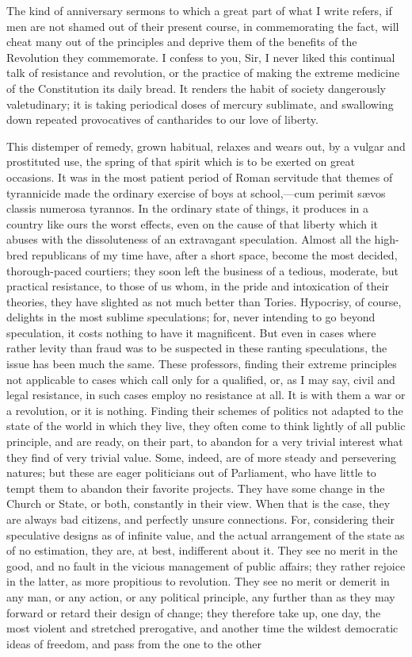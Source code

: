 The kind of anniversary sermons to which a great part of what I write refers, if men are not shamed out of their present course, in commemorating the fact, will cheat many out of the principles and deprive them of the benefits of the Revolution they commemorate. I confess to you, Sir, I never liked this continual talk of resistance and revolution, or the practice of making the extreme medicine of the Constitution its daily bread. It renders the habit of society dangerously valetudinary; it is taking periodical doses of mercury sublimate, and swallowing down repeated provocatives of cantharides to our love of liberty.

This distemper of remedy, grown habitual, relaxes and wears out, by a vulgar and prostituted use, the spring of that spirit which is to be exerted on great occasions. It was in the most patient period of Roman servitude that themes of tyrannicide made the ordinary exercise of boys at school,—cum perimit sævos classis numerosa tyrannos. In the ordinary state of things, it produces in a country like ours the worst effects, even on the cause of that liberty which it abuses with the dissoluteness of an extravagant speculation. Almost all the high-bred republicans of my time have, after a short space, become the most decided, thorough-paced courtiers; they soon left the business of a tedious, moderate, but practical resistance, to those of us whom, in the pride and intoxication of their theories, they have slighted as not much better than Tories. Hypocrisy, of course, delights in the most sublime speculations; for, never intending to go beyond speculation, it costs nothing to have it magnificent. But even in cases where rather levity than fraud was to be suspected in these ranting speculations, the issue has been much the same. These professors, finding their extreme principles not applicable to cases which call only for a qualified, or, as I may say, civil and legal resistance, in such cases employ no resistance at all. It is with them a war or a revolution, or it is nothing. Finding their schemes of politics not adapted to the state of the world in which they live, they often come to think lightly of all public principle, and are ready, on their part, to abandon for a very trivial interest what they find of very trivial value. Some, indeed, are of more steady and persevering natures; but these are eager politicians out of Parliament, who have little to tempt them to abandon their favorite projects. They have some change in the Church or State, or both, constantly in their view. When that is the case, they are always bad citizens, and perfectly unsure connections. For, considering their speculative designs as of infinite value, and the actual arrangement of the state as of no estimation, they are, at best, indifferent about it. They see no merit in the good, and no fault in the vicious management of public affairs; they rather rejoice in the latter, as more propitious to revolution. They see no merit or demerit in any man, or any action, or any political principle, any further than as they may forward or retard their design of change; they therefore take up, one day, the most violent and stretched prerogative, and another time the wildest democratic ideas of freedom, and pass from the one to the other 